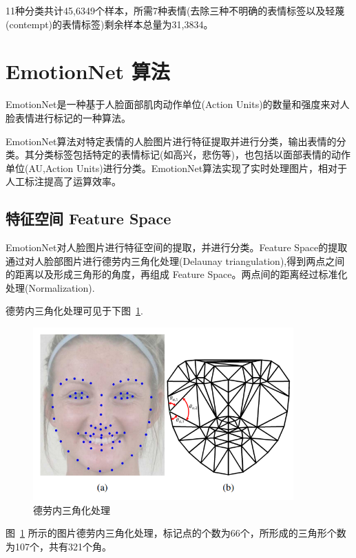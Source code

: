 \documentclass[11pt, a4paper]{article}
\begin{document}
11种分类共计45,6349个样本，所需7种表情(去除三种不明确的表情标签以及轻蔑(contempt)的表情标签)剩余样本总量为31,3834。



\section{EmotionNet 算法}

EmotionNet是一种基于人脸面部肌肉动作单位(Action Units)的数量和强度来对人脸表情进行标记的一种算法。

EmotionNet算法对特定表情的人脸图片进行特征提取并进行分类，输出表情的分类。其分类标签包括特定的表情标记(如高兴，悲伤等)，也包括以面部表情的动作单位(AU,Action Units)进行分类。EmotionNet算法实现了实时处理图片，相对于人工标注提高了运算效率。

\subsection{特征空间 Feature Space}

EmotionNet对人脸图片进行特征空间的提取，并进行分类。Feature Space的提取通过对人脸部图片进行德劳内三角化处理(Delaunay triangulation),得到两点之间的距离以及形成三角形的角度，再组成 Feature Space。两点间的距离经过标准化处理(Normalization). 

德劳内三角化处理可见于下图~\ref{Fig:feature_space}. 

 \begin{figure}[htbp]
	
	\centering %
	\includegraphics[width=10cm]{feature}
	
	\caption{德劳内三角化处理}
	\label{Fig:feature_space}
	
\end{figure}

图~\ref{Fig:feature_space} 所示的图片德劳内三角化处理，标记点的个数为66个，所形成的三角形个数为107个，共有321个角。
\end{document}
